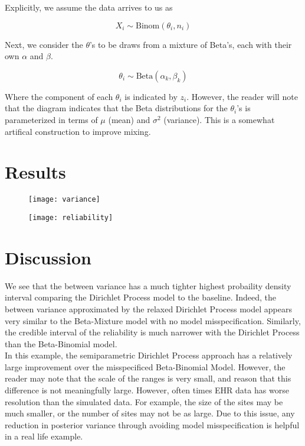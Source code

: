 \documentclass{article}
\begin{document}
Explicitly, we assume the data arrives to us as

\begin{equation}\label{eq:data}
    X_i \sim \text{Binom}(\theta_i, n_i)
\end{equation}

Next, we consider the $\theta$'s to be draws from a mixture of Beta's, each with their own $\alpha$ and $\beta$.

\begin{equation}\label{eq:theta}
    \theta_i \sim \text{Beta}(\alpha_k, \beta_k)
\end{equation}

Where the component of each $\theta_i$ is indicated by $z_i$. However, the reader will note that the diagram indicates that the Beta distributions for the $\theta_i$'s is parameterized in terms of $\mu$ (mean) and $\sigma^2$ (variance). This is a somewhat artifical construction to improve mixing.

\section{Results}

\begin{figure}
\texttt{[image: variance]}
\end{figure}

\begin{figure}
\texttt{[image: reliability]}
\end{figure}

\section{Discussion}

We see that the between variance has a much tighter highest probaility density interval comparing the Dirichlet Process model to the baseline. Indeed, the between variance approximated by the relaxed Dirichlet Process model appears very similar to the Beta-Mixture model with no model misspecification. Similarly, the credible interval of the reliability is much narrower with the Dirichlet Process than the Beta-Binomial model. \\

In this example, the semiparametric Dirichlet Process approach has a relatively large improvement over the misspecificed Beta-Binomial Model. However, the reader may note that the scale of the ranges is very small, and reason that this difference is not meaningfully large. However, often times EHR data has worse resolution than the simulated data. For example, the size of the sites may be much smaller, or the number of sites may not be as large. Due  to this issue, any reduction in posterior variance through avoiding model misspecification is helpful in a real life example.


\end{document}
